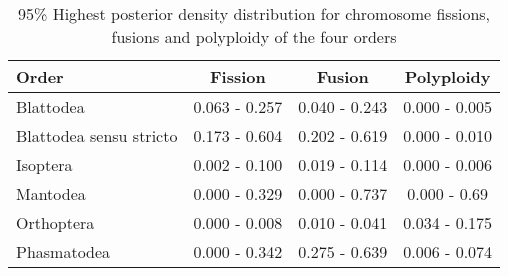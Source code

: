 \begin{table}[ht]
\centering
\begin{tabular}{lccc}
\hline
\textbf{Order}          & \textbf{Fission} & \textbf{Fusion} & \textbf{Polyploidy} \\ \hline
Blattodea               & 0.063 - 0.257    & 0.040 - 0.243    & 0.000 - 0.005           \\
Blattodea sensu stricto & 0.173 - 0.604    & 0.202 - 0.619   & 0.000 - 0.010            \\
Isoptera                & 0.002 - 0.100      & 0.019 - 0.114   & 0.000 - 0.006           \\
Mantodea                & 0.000 - 0.329        & 0.000 - 0.737       & 0.000 - 0.69            \\
Orthoptera              & 0.000 - 0.008        & 0.010 - 0.041    & 0.034 - 0.175       \\
Phasmatodea             & 0.000 - 0.342        & 0.275 - 0.639   & 0.006 - 0.074       \\ \hline
\end{tabular}
\caption{95\% Highest posterior density distribution for chromosome fissions, fusions and polyploidy of the four orders}
\label{tab:HPD}
\end{table}